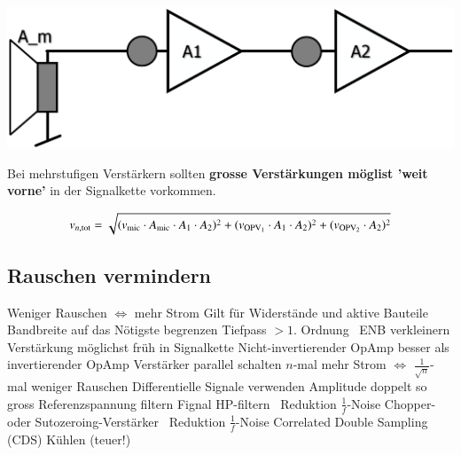 \begin{minipage}[c]{0.4\columnwidth}
    \includegraphics[width=\columnwidth]{images/signal_to_noise_ratio.png}
\end{minipage}
\hfill
\begin{minipage}[c]{0.58\columnwidth}
    Bei mehrstufigen Verstärkern sollten \textbf{grosse Verstärkungen möglist 'weit vorne'} in der Signalkette vorkommen.
\end{minipage}

$$ v_{n, \rm tot} = \sqrt{(v_{\rm mic} \cdot A_{\rm mic} \cdot A_1 \cdot A_2)^2
+ (v_{\rm OPV_1} \cdot A_1 \cdot A_2)^2 + (v_{\rm OPV_2} \cdot  A_2)^2 } $$


\subsection{Rauschen vermindern}

\begin{outline}
    \1 Weniger Rauschen $\Leftrightarrow$ mehr Strom
        \2 Gilt für Widerstände und aktive Bauteile
    \1 Bandbreite auf das Nötigste begrenzen
        \2 Tiefpass $> 1.$ Ordnung \textrightarrow\ ENB verkleinern
    \1 Verstärkung möglichst früh in Signalkette
    \1 Nicht-invertierender OpAmp besser als invertierender OpAmp
    \1 Verstärker parallel schalten
        \2 $n$-mal mehr Strom $\Leftrightarrow$ $\frac{1}{\sqrt{n}}$-mal weniger Rauschen
    \1 Differentielle Signale verwenden
        \2 Amplitude doppelt so gross
    \1 Referenzspannung filtern
    \1 Fignal HP-filtern \textrightarrow\ Reduktion $\frac{1}{f}$-Noise
    \1 Chopper- oder Sutozeroing-Verstärker \textrightarrow\ Reduktion $\frac{1}{f}$-Noise
    \1 Correlated Double Sampling (CDS)
    \1 Kühlen (teuer!)
\end{outline}

